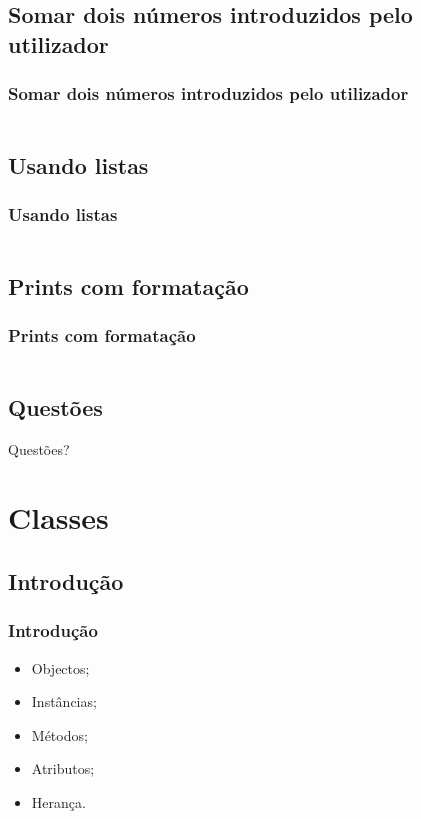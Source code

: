 \documentclass{beamer}
\begin{document}
	\subsection*{Somar dois números introduzidos pelo utilizador}
	\begin{frame}[fragile]
		\frametitle{Somar dois números introduzidos pelo utilizador}
		\inputminted{python}{sumTwoInts.py}
	\end{frame}
	
	\subsection*{Usando listas}
	\begin{frame}[fragile]
		\frametitle{Usando listas}
		\inputminted{python}{lists.py}
	\end{frame}
	
	\subsection*{Prints com formatação}
	\begin{frame}[fragile]
		\frametitle{Prints com formatação}
		\inputminted[breaklines]{python}{formattedPrinting.py}
	\end{frame}
	
	\subsection*{Questões}
	\begin{frame}
		\begin{center}\huge{Questões?}\end{center}
	\end{frame}
	
	\section{Classes}
	\subsection*{Introdução}
	\begin{frame}[fragile]
		\frametitle{Introdução}
		\begin{itemize}
			\item Objectos; \pause
			\item Instâncias; \pause
			\item Métodos; \pause
			\item Atributos; \pause
			\item Herança.
		\end{itemize}
	\end{frame}
	
\end{document}
